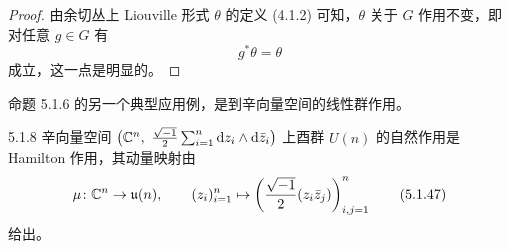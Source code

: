 \begin{proof}
  由余切丛上 Liouville 形式 $\theta$ 的定义 (4.1.2) 可知，$\theta$ 关于 $G$ 作用不变，即对任意 $g\in G$ 有
  \begin{equation}
    g^*\theta=\theta
    \tag{5.1.46}
  \end{equation}
  成立，这一点是明显的。
\end{proof}

命题 5.1.6 的另一个典型应用例，是到辛向量空间的线性群作用。

\begin{proposition*}{5.1.8}
  辛向量空间 $\bigl(\C^n,\ \frac{\sqrt{-1}}{2}\sum_{i=1}^n\rd z_i\wedge\rd\bar z_i\bigr)$ 上酉群 $U(n)$ 的自然作用是 Hamilton 作用，其动量映射由
  \begin{equation}
    \mu\colon\mathbb{C}^n\to\mathfrak{u}(n),\qquad (z_i)_{i=1}^n\mapsto\left(\frac{\sqrt{-1}}{2}(z_i\bar z_j)\right)_{i,j=1}^n
    \tag{5.1.47}
  \end{equation}
  给出。
\end{proposition*}

